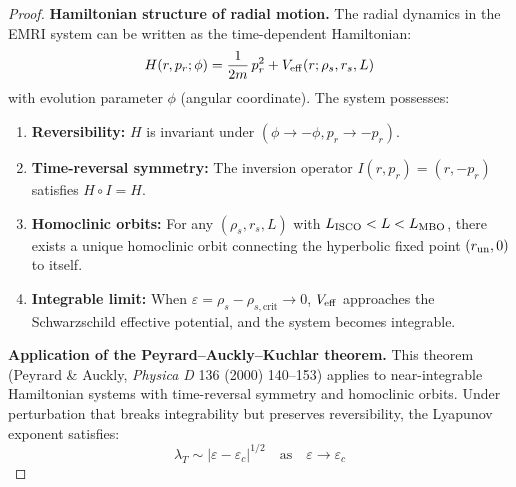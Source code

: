 \begin{proof}
\textbf{Hamiltonian structure of radial motion.} The radial dynamics in the EMRI system can be written as the time-dependent Hamiltonian:
\begin{equation}
H(r, p_r; \phi) = \frac{1}{2m}\,p_r^2 + V_{\rm eff}(r; \rho_s, r_s, L)
\end{equation}
with evolution parameter $\phi$ (angular coordinate). The system possesses:
\begin{enumerate}
\item \textbf{Reversibility:} $H$ is invariant under $(\phi \to -\phi, p_r \to -p_r)$.
\item \textbf{Time-reversal symmetry:} The inversion operator $I(r, p_r) = (r, -p_r)$ satisfies $H \circ I = H$.
\item \textbf{Homoclinic orbits:} For any $(\rho_s, r_s, L)$ with $L_{\rm ISCO} < L < L_{\rm MBO}$, there exists a unique homoclinic orbit connecting the hyperbolic fixed point $(r_{\rm un}, 0)$ to itself.
\item \textbf{Integrable limit:} When $\varepsilon = \rho_s - \rho_{s,\text{crit}} \to 0$, $V_{\rm eff}$ approaches the Schwarzschild effective potential, and the system becomes integrable.
\end{enumerate}

\textbf{Application of the Peyrard--Auckly--Kuchlar theorem.} This theorem (Peyrard \& Auckly, \textit{Physica D} 136 (2000) 140--153) applies to near-integrable Hamiltonian systems with time-reversal symmetry and homoclinic orbits. Under perturbation that breaks integrability but preserves reversibility, the Lyapunov exponent satisfies:
\begin{equation}
\lambda_T \sim |\varepsilon - \varepsilon_c|^{1/2} \quad \text{as} \quad \varepsilon \to \varepsilon_c
\end{equation}


\end{proof}

